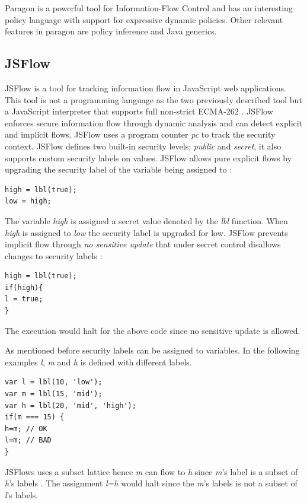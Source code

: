 Paragon is a powerful tool for Information-Flow Control and has an interesting policy language with support for expressive dynamic policies. Other relevant features in paragon are policy inference and Java generics.

\subsection{JSFlow}

JSFlow is a tool for tracking information flow in JavaScript web applications. This tool is not a programming language as the two previously described tool but a JavaScript interpreter that supports full non-strict ECMA-262 \cite{jsflowsite}. JSFlow enforces secure information flow through dynamic analysis and can detect explicit and implicit flows. JSFlow uses a program counter \emph{pc} to track the security context. JSFlow defines two built-in security levels; \emph{public} and \emph{secret}, it also supports custom security labels on values. JSFlow allows pure explicit flows by upgrading the security label of the variable being assigned to \cite{jsflowsite}:

\begin{lstlisting}
high = lbl(true);
low = high;
\end{lstlisting}

The variable \emph{high} is assigned a secret value denoted by the \emph{lbl} function. When \emph{high} is assigned to \emph{low} the security label is upgraded for low. JSFlow prevents implicit flow through \emph{no sensitive update} that under secret control disallows changes to security labels \cite{Hedin2014}:

\begin{lstlisting}
high = lbl(true);
if(high){
l = true;
}
\end{lstlisting}

The execution would halt for the above code since no sensitive update is allowed. 

As mentioned before security labels can be assigned to variables. In the following examples \emph{l}, \emph{m} and \emph{h} is defined with different labels.

\begin{lstlisting}
var l = lbl(10, 'low');
var m = lbl(15, 'mid');
var h = lbl(20, 'mid', 'high');
if(m === 15) {
h=m; // OK
l=m; // BAD
}
\end{lstlisting}

JSFlows uses a subset lattice hence \emph{m} can flow to \emph{h} since \emph{m}'s label is a subset of \emph{h}'s labels \cite{jsflowsite}. The assignment \emph{l=h} would halt since the \emph{m}'s labels is not a subset of \emph{l}'s labels.


